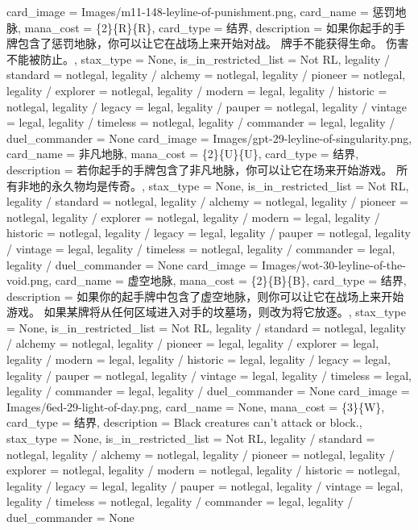 \documentclass[lang = cn, color = black, 10pt]{AllThatStax}
\begin{document}
\card
{
	card_image = Images/m11-148-leyline-of-punishment.png,
	card_name = 惩罚地脉,
	mana_cost = \{2\}\{R\}\{R\},
	card_type = 结界,
	description = 如果你起手的手牌包含了惩罚地脉，你可以让它在战场上来开始对战。
	牌手不能获得生命。
	伤害不能被防止。,
	stax_type = None,
	is_in_restricted_list = Not RL,
	legality / standard = notlegal,
	legality / alchemy = notlegal,
	legality / pioneer = notlegal,
	legality / explorer = notlegal,
	legality / modern = legal,
	legality / historic = notlegal,
	legality / legacy = legal,
	legality / pauper = notlegal,
	legality / vintage = legal,
	legality / timeless = notlegal,
	legality / commander = legal,
	legality / duel_commander = None
}
\card
{
	card_image = Images/gpt-29-leyline-of-singularity.png,
	card_name = 非凡地脉,
	mana_cost = \{2\}\{U\}\{U\},
	card_type = 结界,
	description = 若你起手的手牌包含了非凡地脉，你可以让它在场来开始游戏。
	所有非地的永久物均是传奇。,
	stax_type = None,
	is_in_restricted_list = Not RL,
	legality / standard = notlegal,
	legality / alchemy = notlegal,
	legality / pioneer = notlegal,
	legality / explorer = notlegal,
	legality / modern = legal,
	legality / historic = notlegal,
	legality / legacy = legal,
	legality / pauper = notlegal,
	legality / vintage = legal,
	legality / timeless = notlegal,
	legality / commander = legal,
	legality / duel_commander = None
}
\card
{
	card_image = Images/wot-30-leyline-of-the-void.png,
	card_name = 虚空地脉,
	mana_cost = \{2\}\{B\}\{B\},
	card_type = 结界,
	description = 如果你的起手牌中包含了虚空地脉，则你可以让它在战场上来开始游戏。
	如果某牌将从任何区域进入对手的坟墓场，则改为将它放逐。,
	stax_type = None,
	is_in_restricted_list = Not RL,
	legality / standard = notlegal,
	legality / alchemy = notlegal,
	legality / pioneer = legal,
	legality / explorer = legal,
	legality / modern = legal,
	legality / historic = legal,
	legality / legacy = legal,
	legality / pauper = notlegal,
	legality / vintage = legal,
	legality / timeless = legal,
	legality / commander = legal,
	legality / duel_commander = None
}
\card
{
	card_image = Images/6ed-29-light-of-day.png,
	card_name = None,
	mana_cost = \{3\}\{W\},
	card_type = 结界,
	description = Black creatures can't attack or block.,
	stax_type = None,
	is_in_restricted_list = Not RL,
	legality / standard = notlegal,
	legality / alchemy = notlegal,
	legality / pioneer = notlegal,
	legality / explorer = notlegal,
	legality / modern = notlegal,
	legality / historic = notlegal,
	legality / legacy = legal,
	legality / pauper = notlegal,
	legality / vintage = legal,
	legality / timeless = notlegal,
	legality / commander = legal,
	legality / duel_commander = None
}
\end{document}
